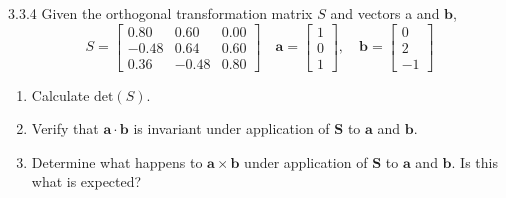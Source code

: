 \documentclass{article}
\begin{document}
\begin{flushleft}
\begin{mybox}{3.3.4}
Given the orthogonal transformation matrix $S$ and vectors a and $\mathbf{b}$, 
$$S=\begin{bmatrix}{0.80} & {0.60} & {0.00} \\ {-0.48} & {0.64} & {0.60} \\ {0.36} & {-0.48} & {0.80}\end{bmatrix} \quad \mathbf{a}=\begin{bmatrix}{1} \\ {0} \\ {1}\end{bmatrix}, \quad \mathbf{b}=\begin{bmatrix}{0} \\ {2} \\ {-1}\end{bmatrix}$$
\begin{enumerate}[$(a)$]
\item Calculate $\text{det}(S)$.
\item Verify that $\mathbf{a}\cdot \mathbf{b}$ is invariant under application of $\mathbf{S}$ to $\mathbf{a}$ and $\mathbf{b}$.
\item Determine what happens to $\mathbf{a}\times \mathbf{b}$ under application of $\mathbf{S}$ to $\mathbf{a}$ and $\mathbf{b}$. Is this what is expected?
\end{enumerate}
\end{mybox}


\end{flushleft}
\end{document}
